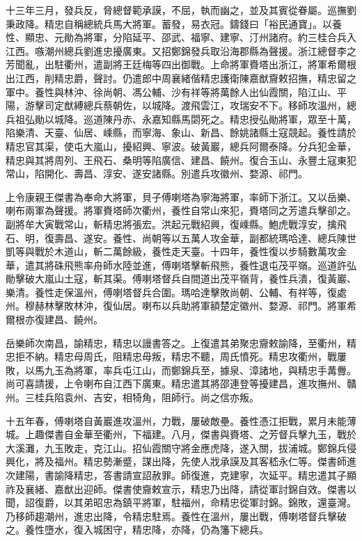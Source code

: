 \begin{pinyinscope}
十三年三月，發兵反，脅總督範承謨，不屈，執而幽之，並及其賓從眷屬。巡撫劉秉政降。精忠自稱總統兵馬大將軍。蓄發，易衣冠。鑄錢曰「裕民通寶」。以養性、顯忠、元勛為將軍，分陷延平、邵武、福寧、建寧、汀州諸府。約三桂合兵入江西。嗾潮州總兵劉進忠擾廣東。又招鄭錦發兵取沿海郡縣為聲援。浙江總督李之芳聞亂，出駐衢州，遣副將王廷梅等四出御戰。上命將軍賚塔出浙江，將軍希爾根出江西，削精忠爵，聲討。仍遣郎中周襄緒偕精忠護衛陳嘉猷齎敕招撫，精忠留之軍中。養性與林沖、徐尚朝、馮公輔、沙有祥等將萬餘人出仙霞關，陷江山、平陽，游擊司定猷縛總兵蔡朝佐，以城降。渡飛雲江，攻瑞安不下。移師攻溫州，總兵祖弘勛以城降。巡道陳丹赤、永嘉知縣馬閟死之。精忠授弘勛將軍，眾至十萬，陷樂清、天臺、仙居、嵊縣，而寧海、象山、新昌、餘姚諸縣土寇競起。養性請於精忠官其渠，使屯大嵐山，擾紹興、寧波。破黃巖，總兵阿爾泰降。分兵犯金華，精忠與其將周列、王飛石、桑明等陷廣信、建昌、饒州。復合玉山、永豐土寇東犯常山，陷開化、壽昌、淳安、遂安諸縣。別遣兵攻徽州、婺源、祁門。

上令康親王傑書為奉命大將軍，貝子傅喇塔為寧海將軍，率師下浙江。又以岳樂、喇布兩軍為聲援。將軍賚塔師次衢州，養性自常山來犯，賚塔同之芳遣兵擊卻之。副將牟大寅戰常山，斬精忠將張宏。洪起元戰紹興，復嵊縣。鮑虎戰淳安，擒飛石、明，復壽昌、遂安。養性、尚朝等以五萬人攻金華，副都統瑪哈達、總兵陳世凱等與戰於木道山，斬二萬餘級，養性走天臺。十四年，養性復以步騎數萬攻金華，遣其將硃飛熊率舟師水陸並進，傅喇塔擊斬飛熊，養性退屯茂平嶺。巡道許弘勛擊破大嵐山土寇，斬其渠。傅喇塔督兵自間道出茂平嶺背，養性兵潰，復黃巖、樂清。養性走保溫州，傅喇塔督兵合圍。瑪哈達擊敗尚朝、公輔、有祥等，復處州。穆赫林擊敗林沖，復仙居。喇布以兵助將軍額楚定徽州、婺源、祁門。將軍希爾根亦復建昌、饒州。

岳樂師次南昌，諭精忠，精忠以謾書答之。上復遣其弟聚忠齎敕諭降，至衢州，精忠拒不納。精忠母周氏，阻精忠毋叛，精忠不聽，周氏憤死。精忠攻衢州，戰屢敗，以馬九玉為將軍，率兵屯江山，而鄭錦兵至，據泉、漳諸地，與精忠手冓釁。尚可喜請援，上令喇布自江西下廣東。精忠遣其將邵連登等擾建昌，進攻撫州、贛州。三桂兵陷袁州、吉安，相犄角，阻師行。尚之信亦叛。

十五年春，傅喇塔自黃巖進攻溫州，力戰，屢破敵壘。養性憑江拒戰，累月未能薄城。上趣傑書自金華至衢州，下福建。八月，傑書與賚塔、之芳督兵擊九玉，戰於大溪灘，九玉敗走，克江山。招仙霞關守將金應虎降，遂入關，拔浦城。鄭錦兵侵興化，將及福州。精忠勢漸蹙，謀出降，先使人戕承謨及其客嵇永仁等。傑書師進次建陽，書諭降精忠，答書請宣詔赦罪。師復進，克建寧，次延平。精忠遣其子顯祚及襄緒、嘉猷出迎師。傑書使齎敕宣示，精忠乃出降，請從軍討錦自效。傑書以聞，詔復爵，以其弟昭忠為鎮平將軍，駐福州，命精忠從軍討錦。錦敗，還臺灣。乃移師趨潮州，進忠出降，令精忠駐焉。養性在溫州，屢出戰，傅喇塔督兵擊破之。養性墮水，復入城困守，精忠降，亦降，仍為籓下總兵。


\end{pinyinscope}
